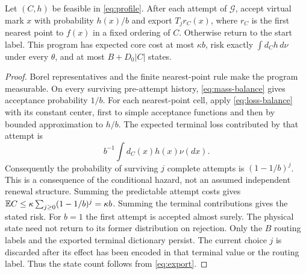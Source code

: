 \begin{lemma}\label{lem:upper}
Let $(C,h)$ be feasible in \eqref{eq:profile}. After each attempt of $\mathcal G$, accept virtual mark $x$ with probability $h(x)/b$ and export $T_jr_C(x)$, where $r_C$ is the first nearest point to $f(x)$ in a fixed ordering of $C$. Otherwise return to the start label. This program has expected core cost at most $\kappa b$, risk exactly $\int d_C h\,d\nu$ under every $\theta$, and at most $B+D_0|C|$ states.
\end{lemma}
\begin{proof}
Borel representatives and the finite nearest-point rule make the program measurable. On every surviving pre-attempt history, \eqref{eq:mass-balance} gives acceptance probability $1/b$. For each nearest-point cell, apply \eqref{eq:loss-balance} with its constant center, first to simple acceptance functions and then by bounded approximation to $h/b$. The expected terminal loss contributed by that attempt is
\[
 b^{-1}\int d_C(x)h(x)\nu(dx).
\]
Consequently the probability of surviving $j$ complete attempts is $(1-1/b)^j$. This is a consequence of the conditional hazard, not an assumed independent renewal structure. Summing the predictable attempt costs gives $\mathbb E C\le\kappa\sum_{j\ge0}(1-1/b)^j=\kappa b$. Summing the terminal contributions gives the stated risk. For $b=1$ the first attempt is accepted almost surely. The physical state need not return to its former distribution on rejection. Only the $B$ routing labels and the exported terminal dictionary persist. The current choice $j$ is discarded after its effect has been encoded in that terminal value or the routing label. Thus the state count follows from \eqref{eq:export}.
\end{proof}

